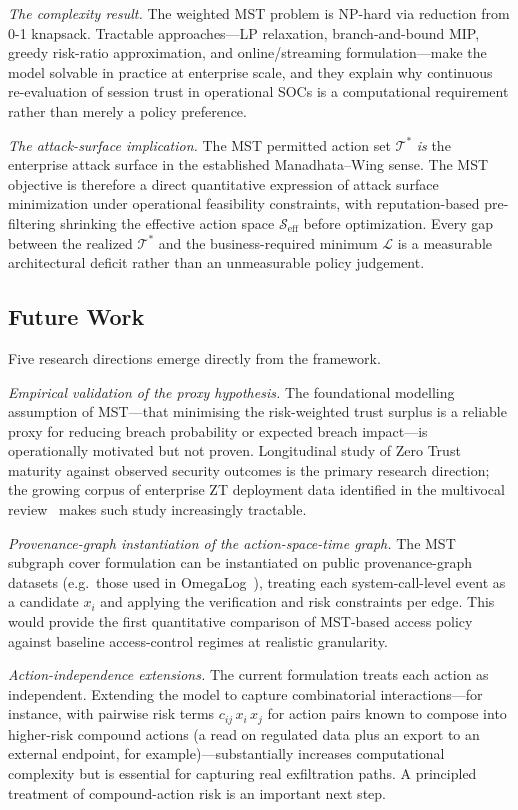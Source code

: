 \documentclass[acmlarge]{acmart}
\begin{document}
\textit{The complexity result.} The weighted MST problem is NP-hard via
reduction from 0-1 knapsack. Tractable approaches---LP relaxation,
branch-and-bound MIP, greedy risk-ratio approximation, and online/streaming
formulation---make the model solvable in practice at enterprise scale,
and they explain why continuous re-evaluation of session trust in
operational SOCs is a computational requirement rather than merely a
policy preference.

\textit{The attack-surface implication.} The MST permitted action set
$\mathcal{T}^{*}$ \textit{is} the enterprise attack surface in the
established Manadhata--Wing sense. The MST objective is therefore a
direct quantitative expression of attack surface minimization under
operational feasibility constraints, with reputation-based pre-filtering
shrinking the effective action space $\mathcal{S}_{\text{eff}}$ before
optimization. Every gap between the realized $\mathcal{T}^{*}$ and the
business-required minimum $\mathcal{L}$ is a measurable architectural
deficit rather than an unmeasurable policy judgement.

\subsection{Future Work}
\label{sec:future_work}

Five research directions emerge directly from the framework.

\textit{Empirical validation of the proxy hypothesis.} The foundational
modelling assumption of MST---that minimising the risk-weighted trust
surplus is a reliable proxy for reducing breach probability or expected
breach impact---is operationally motivated but not proven. Longitudinal
study of Zero Trust maturity against observed security outcomes is the
primary research direction; the growing corpus of enterprise ZT
deployment data identified in the multivocal review~\cite{buck2021}
makes such study increasingly tractable.

\textit{Provenance-graph instantiation of the action-space-time graph.}
The MST subgraph cover formulation can be instantiated on public
provenance-graph datasets (e.g.\ those used in
OmegaLog~\cite{hassan2020provenance}), treating each system-call-level
event as a candidate $x_i$ and applying the verification and risk
constraints per edge. This would provide the first quantitative comparison
of MST-based access policy against baseline access-control regimes at
realistic granularity.

\textit{Action-independence extensions.} The current formulation treats
each action as independent. Extending the model to capture
combinatorial interactions---for instance, with pairwise risk terms
$c_{ij}\, x_i\, x_j$ for action pairs known to compose into higher-risk
compound actions (a read on regulated data plus an export to an external
endpoint, for example)---substantially increases computational complexity
but is essential for capturing real exfiltration paths. A principled
treatment of compound-action risk is an important next step.
\end{document}
